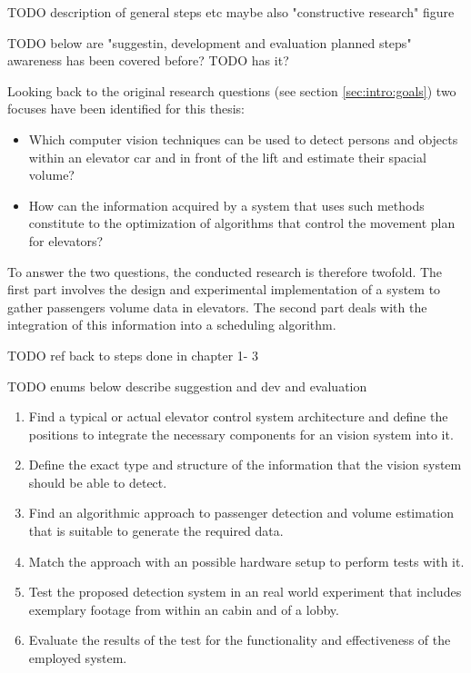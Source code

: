 TODO description of general steps etc
maybe also "constructive research" figure

TODO below are "suggestin, development and evaluation planned steps" awareness has been covered before? TODO has it?

Looking back to the original research questions (see section \vref{sec:intro:goals}) two focuses have been identified for this thesis:

\begin{itemize}
    \item Which computer vision techniques can be used to detect persons and objects within an elevator car and in front of the lift and estimate their spacial volume?
    \item How can the information acquired by a system that uses such methods constitute to the optimization of algorithms that control the movement plan for elevators?
\end{itemize}

To answer the two questions, the conducted research is therefore twofold.
The first part involves the design and experimental implementation of a system to gather passengers volume data in elevators.
The second part deals with the integration of this information into a scheduling algorithm.

TODO ref back to steps done in chapter 1- 3

TODO enums below describe suggestion and dev and evaluation

\begin{enumerate}
    \item Find a typical or actual elevator control system architecture and define the positions to integrate the necessary components for an vision system into it.
    \item Define the exact type and structure of the information that the vision system should be able to detect.
    \item Find an algorithmic approach to  passenger detection and volume estimation that is suitable to generate the required data.
    \item Match the approach with an possible hardware setup to perform tests with it.
    \item Test the proposed detection system in an real world experiment that includes  exemplary footage from within an cabin and of a lobby.
    \item Evaluate the results of the test for the functionality and effectiveness of the employed system.
\end{enumerate}

